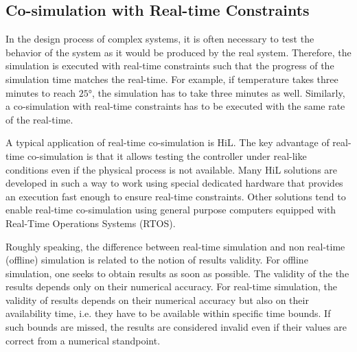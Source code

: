 

 

\subsection{Co-simulation with Real-time Constraints}

In the design process of complex systems, it is often necessary to test the behavior of the system as it would be produced by the real system. Therefore, the simulation is executed with real-time constraints such that the progress of the simulation time matches the real-time. For example, if temperature takes three minutes to reach $25$°, the simulation has to take three minutes as well. Similarly, a co-simulation with real-time constraints has to be executed with the same rate of the real-time.

A typical application of real-time co-simulation is HiL. The key advantage of real-time co-simulation is that it allows testing the controller under real-like conditions even if the physical process is not available. Many HiL solutions are developed in such a way to work using special dedicated hardware that provides an execution fast enough to ensure real-time constraints. Other solutions tend to enable real-time co-simulation using general purpose computers equipped with Real-Time Operations Systems (RTOS).

Roughly speaking, the difference between real-time simulation and non real-time (offline) simulation is related to the notion of results validity. For offline simulation, one seeks to obtain results as soon as possible. The validity of the the results depends only on their numerical accuracy. For real-time simulation, the validity of results depends on their numerical accuracy but also on their availability time, i.e. they have to be available within specific time bounds. If such bounds are missed, the results are considered invalid even if their values are correct from a numerical standpoint.

